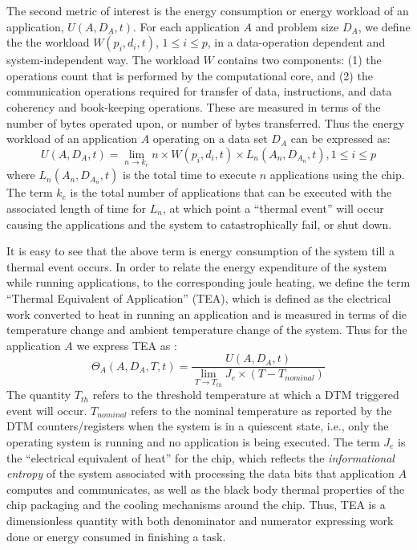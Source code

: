 The second metric of interest is the energy consumption or energy
workload of an application, $U(A,D_{A},t)$. For each application $A$ and
problem size $D_{A}$, we define the the workload $W(p_{i},d_{i},t)$, $1
\leq i \leq p$, in a data-operation dependent and system-independent
way. The workload $W$ contains two components: (1) the operations
count that is performed by the computational core, and (2) the
communication operations required for transfer of data, instructions, and data
coherency and book-keeping operations. These are measured in terms of
the number of bytes operated upon, or number of bytes transferred. Thus
the energy workload of an application $A$ operating on a data set $D_A$
can be expressed as:
\begin{equation}
\label{eq:eworkload}
U(A,D_{A},t) = \displaystyle \lim_{n \to k_e }n \times W(p_i,d_i,t)
\times L_n(A_{n},D_{A_{n}},t), 1\leq i \leq p
\end{equation}
where $L_n(A_{n},D_{A_{n}},t)$ is the total time to execute $n$ applications using
the chip. The term $k_{e}$ is the total number of applications that can be
executed with the associated length of time for $L_n$, at which point a
``thermal event'' will occur causing the applications and the system to
catastrophically fail, or shut down.

It is easy to see that the above term is energy consumption of the
system till a thermal event occurs. In order to relate the energy
expenditure of the system while running applications, to the
corresponding joule heating, we define the term ``Thermal Equivalent of
Application'' (TEA), which is defined as the electrical work converted
to heat in running an application and is measured in terms of die
temperature change and ambient temperature change of the system. Thus for
the application $A$ we express TEA as :
\begin{equation}
\label{eq:tea}
\Theta_A(A,D_{A}, T,t) = \frac{U(A,D_{A},t)}{\displaystyle \lim_{T \to T_{th}} J_e \times (T - T_{nominal})}
\end{equation}
The quantity $T_{th}$ refers to the threshold temperature at which a DTM
triggered event will occur.  $T_{nominal}$ refers to the nominal
temperature as reported by the DTM counters/registers when the system is
in a quiescent state, i.e., only the operating system is running and no
application is being executed. The term $J_{e}$ is the ``electrical
equivalent of heat'' for the chip, which reflects the
\textit{informational entropy} of the system associated with processing
the data bits that application $A$ computes and communicates, as well as
the black body thermal properties of the chip packaging and the cooling
mechanisms around the chip. Thus, TEA is a dimensionless quantity with
both denominator and numerator expressing work done or energy consumed
in finishing a task.

